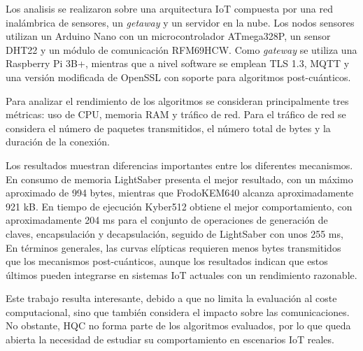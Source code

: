     Los analisis se realizaron sobre una arquitectura IoT compuesta por una red inalámbrica de sensores, un \textit{getaway} y un servidor en la nube.
    Los nodos sensores utilizan un Arduino Nano con un microcontrolador ATmega328P, un sensor DHT22 y un módulo de comunicación 
    RFM69HCW. Como \textit{gateway} se utiliza una Raspberry Pi 3B+, mientras que a nivel software se emplean TLS 1.3, MQTT y una versión modificada 
    de OpenSSL con soporte para algoritmos post-cuánticos.

    Para analizar el rendimiento de los algoritmos se consideran principalmente tres métricas: uso de CPU, memoria RAM y tráfico de red. Para el tráfico de red
    se considera el número de paquetes transmitidos, el número total de bytes y la duración de la conexión. 

    Los resultados muestran diferencias importantes entre los diferentes mecanismos. En consumo de memoria LightSaber presenta el mejor resultado, con un máximo aproximado de 994 bytes, 
    mientras que FrodoKEM640 alcanza aproximadamente 921 kB. En tiempo de ejecución Kyber512 obtiene el mejor comportamiento, con aproximadamente 204 ms para el conjunto de operaciones de 
    generación de claves, encapsulación y decapsulación, seguido de LightSaber con unos 255 ms, En términos generales, las curvas elípticas requieren menos bytes transmitidos que los mecanismos post-cuánticos, aunque los resultados indican que estos últimos pueden integrarse en sistemas 
    IoT actuales con un rendimiento razonable. 

    Este trabajo resulta interesante, debido a que no limita la evaluación al coste computacional, sino que también considera 
    el impacto sobre las comunicaciones. No obstante, HQC no forma parte de los algoritmos evaluados, por lo que queda abierta la necesidad de estudiar 
    su comportamiento en escenarios IoT reales. 
